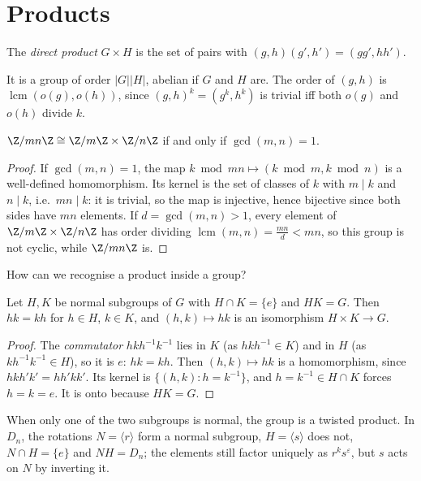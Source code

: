 \section{Products}

\begin{definition}
The \emph{direct product} $G\times H$ is the set of pairs with $(g,h)(g',h')=(gg',hh')$.
\end{definition}

It is a group of order $|G||H|$, abelian if $G$ and $H$ are. The order of $(g,h)$ is $\operatorname{lcm}(o(g),o(h))$, since $(g,h)^k=(g^k,h^k)$ is trivial iff both $o(g)$ and $o(h)$ divide $k$.

\begin{theorem}\label{thm:crt}
$\Z/mn\Z\cong\Z/m\Z\times\Z/n\Z$ if and only if $\gcd(m,n)=1$.
\end{theorem}
\begin{proof}
If $\gcd(m,n)=1$, the map $k\bmod mn\mapsto(k\bmod m,k\bmod n)$ is a well-defined homomorphism. Its kernel is the set of classes of $k$ with $m\mid k$ and $n\mid k$, i.e.\ $mn\mid k$: it is trivial, so the map is injective, hence bijective since both sides have $mn$ elements. If $d=\gcd(m,n)>1$, every element of $\Z/m\Z\times\Z/n\Z$ has order dividing $\operatorname{lcm}(m,n)=\frac{mn}d<mn$, so this group is not cyclic, while $\Z/mn\Z$ is.
\end{proof}

How can we recognise a product inside a group?

\begin{proposition}\label{prop:internal}
Let $H,K$ be normal subgroups of $G$ with $H\cap K=\{e\}$ and $HK=G$. Then $hk=kh$ for $h\in H$, $k\in K$, and $(h,k)\mapsto hk$ is an isomorphism $H\times K\to G$.
\end{proposition}
\begin{proof}
The \emph{commutator} $hkh^{-1}k^{-1}$ lies in $K$ (as $hkh^{-1}\in K$) and in $H$ (as $kh^{-1}k^{-1}\in H$), so it is $e$: $hk=kh$. Then $(h,k)\mapsto hk$ is a homomorphism, since $hkh'k'=hh'kk'$. Its kernel is $\{(h,k):h=k^{-1}\}$, and $h=k^{-1}\in H\cap K$ forces $h=k=e$. It is onto because $HK=G$.
\end{proof}

When only one of the two subgroups is normal, the group is a twisted product. In $D_n$, the rotations $N=\langle r\rangle$ form a normal subgroup, $H=\langle s\rangle$ does not, $N\cap H=\{e\}$ and $NH=D_n$; the elements still factor uniquely as $r^ks^\varepsilon$, but $s$ acts on $N$ by inverting it.

